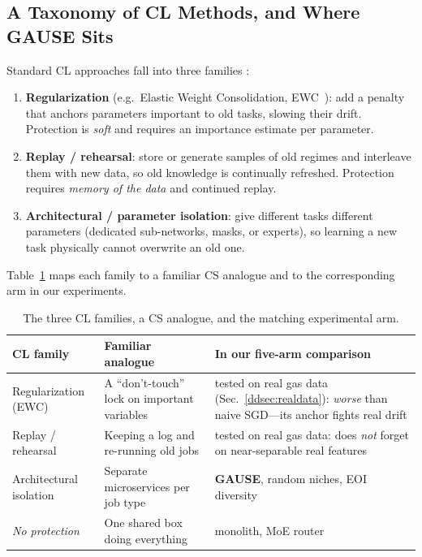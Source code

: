 \documentclass[11pt,a4paper]{article}
\theoremstyle{definition}
\theoremstyle{plain}
\begin{document}
\subsection{A Taxonomy of CL Methods, and Where GAUSE Sits}

Standard CL approaches fall into three families
\cite{parisi2019continual}:
\begin{enumerate}
    \item \textbf{Regularization} (e.g.\ Elastic Weight Consolidation,
    EWC~\cite{kirkpatrick2017overcoming}): add a penalty that anchors parameters
    important to old tasks, slowing their drift. Protection is \emph{soft} and
    requires an importance estimate per parameter.
    \item \textbf{Replay / rehearsal}: store or generate samples of old regimes
    and interleave them with new data, so old knowledge is continually refreshed.
    Protection requires \emph{memory of the data} and continued replay.
    \item \textbf{Architectural / parameter isolation}: give different
    tasks different parameters (dedicated sub-networks, masks, or experts), so
    learning a new task physically cannot overwrite an old one.
\end{enumerate}

Table~\ref{tab:cl_families} maps each family to a familiar CS analogue and to the
corresponding arm in our experiments.

\begin{table}[H]
\centering
\caption{The three CL families, a CS analogue, and the matching experimental arm.}
\label{tab:cl_families}
\begin{tabular}{p{3.1cm}p{4.6cm}p{4.6cm}}
\toprule
CL family & Familiar analogue & In our five-arm comparison \\
\midrule
Regularization (EWC) & A ``don't-touch'' lock on important variables & tested on real gas data (Sec.~\ref{ddsec:realdata}): \emph{worse} than naive SGD---its anchor fights real drift \\[4pt]
Replay / rehearsal & Keeping a log and re-running old jobs & tested on real gas data: does \emph{not} forget on near-separable real features \\[4pt]
Architectural isolation & Separate microservices per job type & \textbf{GAUSE}, random niches, EOI diversity \\[4pt]
\emph{No protection} & One shared box doing everything & monolith, MoE router \\
\bottomrule
\end{tabular}
\end{table}
\end{document}

